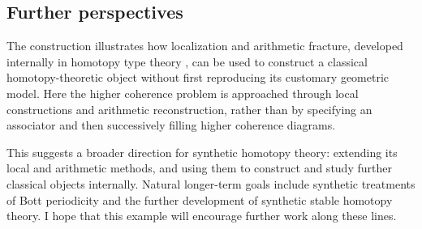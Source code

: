 \subsection{Further perspectives}

The construction illustrates how localization and arithmetic fracture, developed internally in homotopy type theory \cite{cors,scoccola}, can be used to construct a classical homotopy-theoretic object without first reproducing its customary geometric model. Here the higher coherence problem is approached through local constructions and arithmetic reconstruction, rather than by specifying an associator and then successively filling higher coherence diagrams.

This suggests a broader direction for synthetic homotopy theory: extending its local and arithmetic methods, and using them to construct and study further classical objects internally. Natural longer-term goals include synthetic treatments of Bott periodicity and the further development of synthetic stable homotopy theory. I hope that this example will encourage further work along these lines.
